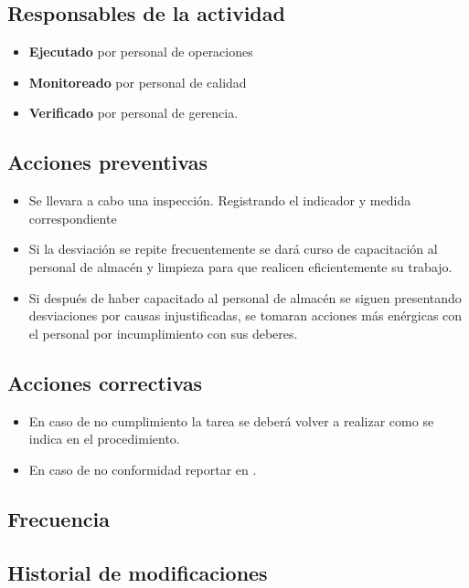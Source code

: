\subsection{Responsables de la actividad}

\begin{itemize}
	\item \textbf{Ejecutado} por personal de operaciones
	\item \textbf{Monitoreado} por personal de calidad
	\item \textbf{Verificado} por personal de gerencia.
\end{itemize}

\subsection{Acciones preventivas}

\begin{itemize}
	\item Se llevara a cabo una inspección. Registrando el indicador y medida correspondiente
	\item Si la desviación se repite frecuentemente se dará curso de capacitación al personal de almacén y limpieza para que realicen eficientemente su trabajo.
	\item Si después de haber capacitado al personal de almacén se siguen presentando desviaciones por causas injustificadas, se tomaran acciones más enérgicas con el personal por incumplimiento con sus deberes.
\end{itemize}

\subsection{Acciones correctivas}

\begin{itemize}
	\item En caso de no cumplimiento la tarea se deberá volver a realizar como se indica en el procedimiento.
	\item En caso de no conformidad reportar en \RAC.
\end{itemize}

\subsection{Frecuencia}

\subsection{Historial de modificaciones}

